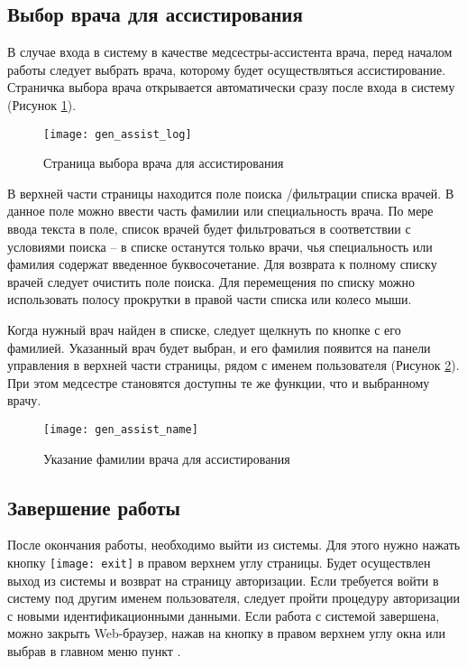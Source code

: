 {
\subsection{Выбор врача для ассистирования}

В случае входа в систему в качестве медсестры-ассистента врача, перед началом работы следует выбрать врача, которому будет осуществляться ассистирование. Страничка выбора врача открывается автоматически сразу после входа в систему (Рисунок \ref{img_gen_assist_log}). 

 \begin{figure}[!ht]\centering
 	\texttt{[image: gen\_assist\_log]}
 	\caption{Страница выбора врача для ассистирования}
 	\label{img_gen_assist_log}
 \end{figure} 

В верхней части страницы находится поле поиска \slash фильтрации списка врачей. В данное поле можно ввести часть фамилии или специальность врача. По мере ввода текста в поле, список врачей будет фильтроваться в соответствии с условиями поиска -- в списке останутся только врачи, чья специальность или фамилия содержат введенное буквосочетание. Для возврата к полному списку врачей следует очистить поле поиска. Для перемещения по списку можно использовать полосу прокрутки в правой части списка или колесо мыши.

Когда нужный врач найден в списке, следует щелкнуть по кнопке с его фамилией. Указанный врач будет выбран, и его фамилия появится на панели управления в верхней части страницы, рядом с именем пользователя (Рисунок \ref{img_gen_assist_name}). При этом медсестре становятся доступны те же функции, что и выбранному врачу.

 \begin{figure}[!ht]\centering
 	\texttt{[image: gen\_assist\_name]}
 	\caption{Указание фамилии врача для ассистирования}
 	\label{img_gen_assist_name}
 \end{figure}
}{} 
 
\subsection{Завершение работы}

После окончания работы, необходимо выйти из системы. Для этого нужно нажать кнопку \texttt{[image: exit]} в правом верхнем углу страницы. Будет осуществлен выход из системы и возврат на страницу авторизации. Если требуется войти в систему под другим именем пользователя, следует пройти процедуру авторизации с новыми идентификационными данными. Если работа с системой завершена, можно закрыть Web-браузер, нажав на кнопку  в правом верхнем углу окна или выбрав в главном меню пункт .



